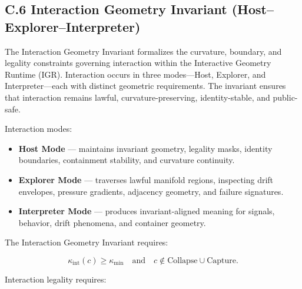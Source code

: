 \subsection*{C.6 Interaction Geometry Invariant (Host–Explorer–Interpreter)}

\noindent The Interaction Geometry Invariant formalizes the curvature, boundary,
and legality constraints governing interaction within the Interactive Geometry
Runtime (IGR). Interaction occurs in three modes—Host, Explorer, and
Interpreter—each with distinct geometric requirements. The invariant ensures
that interaction remains lawful, curvature-preserving, identity-stable, and
public-safe.

\medskip

\noindent Interaction modes:

\begin{itemize}
    \item \textbf{Host Mode} — maintains invariant geometry, legality masks,
    identity boundaries, containment stability, and curvature continuity.

    \item \textbf{Explorer Mode} — traverses lawful manifold regions, inspecting
    drift envelopes, pressure gradients, adjacency geometry, and failure
    signatures.

    \item \textbf{Interpreter Mode} — produces invariant-aligned meaning for
    signals, behavior, drift phenomena, and container geometry.
\end{itemize}

\medskip

\noindent The Interaction Geometry Invariant requires:



\[
\kappa_{\mathrm{int}}(c) \ge \kappa_{\mathrm{min}}
\quad \text{and} \quad
c \notin \text{Collapse} \cup \text{Capture}.
\]



\medskip

\noindent Interaction legality requires:


